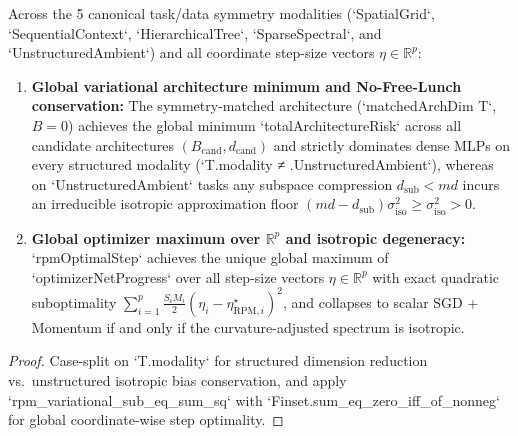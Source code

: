 \begin{lemma}\label{lem:universal_task_taxonomy}
\leanok
{}
Across the 5 canonical task/data symmetry modalities (`SpatialGrid`, `SequentialContext`, `HierarchicalTree`, `SparseSpectral`, and `UnstructuredAmbient`) and all coordinate step-size vectors $\eta \in \mathbb{R}^p$:
\begin{enumerate}
\item \textbf{Global variational architecture minimum and No-Free-Lunch conservation:} The symmetry-matched architecture (`matchedArchDim T`, $B = 0$) achieves the global minimum `totalArchitectureRisk` across all candidate architectures $(B_{\mathrm{cand}}, d_{\mathrm{cand}})$ and strictly dominates dense MLPs on every structured modality (`T.modality ≠ .UnstructuredAmbient`), whereas on `UnstructuredAmbient` tasks any subspace compression $d_{\mathrm{sub}} < md$ incurs an irreducible isotropic approximation floor $(md - d_{\mathrm{sub}})\sigma_{\mathrm{iso}}^2 \ge \sigma_{\mathrm{iso}}^2 > 0$.
\item \textbf{Global optimizer maximum over $\mathbb{R}^p$ and isotropic degeneracy:} `rpmOptimalStep` achieves the unique global maximum of `optimizerNetProgress` over all step-size vectors $\eta \in \mathbb{R}^p$ with exact quadratic suboptimality $\sum_{i=1}^p \frac{S_i M_i}{2}(\eta_i - \eta^{\star}_{\mathrm{RPM},i})^2$, and collapses to scalar SGD + Momentum if and only if the curvature-adjusted spectrum is isotropic.
\end{enumerate}
\end{lemma}
\begin{proof}
\leanok
Case-split on `T.modality` for structured dimension reduction vs.\ unstructured isotropic bias conservation, and apply `rpm_variational_sub_eq_sum_sq` with `Finset.sum_eq_zero_iff_of_nonneg` for global coordinate-wise step optimality.
\end{proof}

